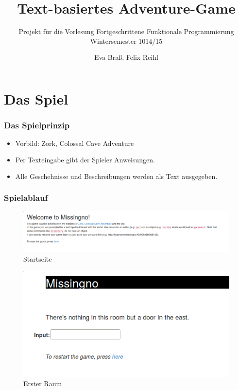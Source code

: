 \documentclass[hyperref={pdfpagelabels=false}]{beamer}
\title{Text-basiertes Adventure-Game}
\author{Eva Braß, Felix Reihl}
\subtitle{Projekt für die Vorlesung Fortgeschrittene Funktionale Programmierung\\Wintersemester 1014/15}
\begin{document}
\begin{frame} \titlepage
\end{frame} 
\begin{frame}
  \tableofcontents
\end{frame} 
\section{Das Spiel}
\begin{frame}
  \frametitle{Das Spielprinzip}
  \begin{itemize}
    \item Vorbild: Zork, Colossal Cave Adventure
    \item Per Texteingabe gibt der Spieler Anweisungen.
    \item Alle Geschehnisse und Beschreibungen werden als Text ausgegeben.
  \end{itemize}
\end{frame} 
\begin{frame}
  \frametitle{Spielablauf}
  \begin{figure}
    \includegraphics[scale=0.25]{screenshots/2015-03-25-103845_1214x243_scrot.png}
    \caption{Startseite}
  \end{figure}
  \begin{figure}
    \includegraphics[scale=0.2]{screenshots/2015-03-25-104814_534x274_scrot.png}
    \caption{Erster Raum}
  \end{figure}
\end{frame}
\end{document}

